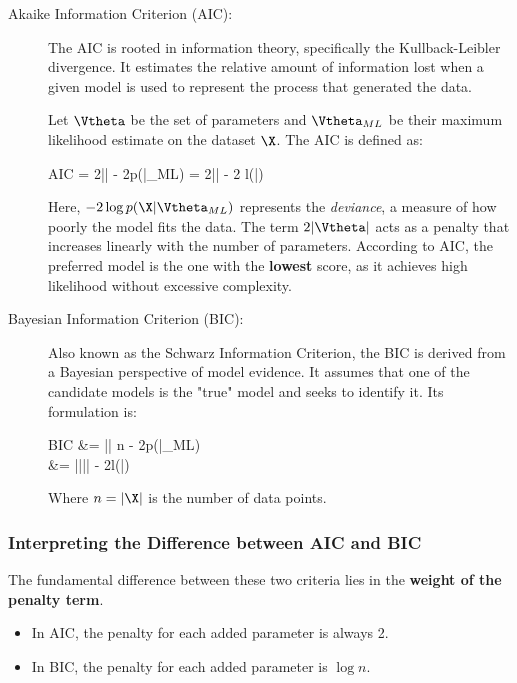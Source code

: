 \begin{description}
    \item[Akaike Information Criterion (AIC):] The AIC is rooted in information theory, specifically the Kullback-Leibler divergence. It estimates the relative amount of information lost when a given model is used to represent the process that generated the data. 
    
    Let $\Vtheta$ be the set of parameters and $\Vtheta_{ML}$ be their maximum likelihood estimate on the dataset $\X$. The AIC is defined as:
    \begin{myequation}
    AIC = 2|\Vtheta| - 2\log p(\X|\Vtheta_{ML}) = 2|\Vtheta| - 2\max{\Vtheta} l(\Vtheta|\X)
    \end{myequation}
    Here, $-2\log p(\X|\Vtheta_{ML})$ represents the \textit{deviance}, a measure of how poorly the model fits the data. The term $2|\Vtheta|$ acts as a penalty that increases linearly with the number of parameters. According to AIC, the preferred model is the one with the \textbf{lowest} score, as it achieves high likelihood without excessive complexity.

    \item[Bayesian Information Criterion (BIC):] Also known as the Schwarz Information Criterion, the BIC is derived from a Bayesian perspective of model evidence. It assumes that one of the candidate models is the "true" model and seeks to identify it. Its formulation is:
    \begin{myalign}
    BIC &= |\Vtheta| \log n - 2\log p(\X|\Vtheta_{ML}) \\
    &= |\Vtheta|\log |\X| - 2\max{\Vtheta}l(\Vtheta|\X)
    \end{myalign}
    Where $n = |\X|$ is the number of data points. 
\end{description}

\subsubsection*{Interpreting the Difference between AIC and BIC}

The fundamental difference between these two criteria lies in the \textbf{weight of the penalty term}. 
\begin{itemize}
    \item In AIC, the penalty for each added parameter is always 2. 
    \item In BIC, the penalty for each added parameter is $\log n$. 
\end{itemize}


